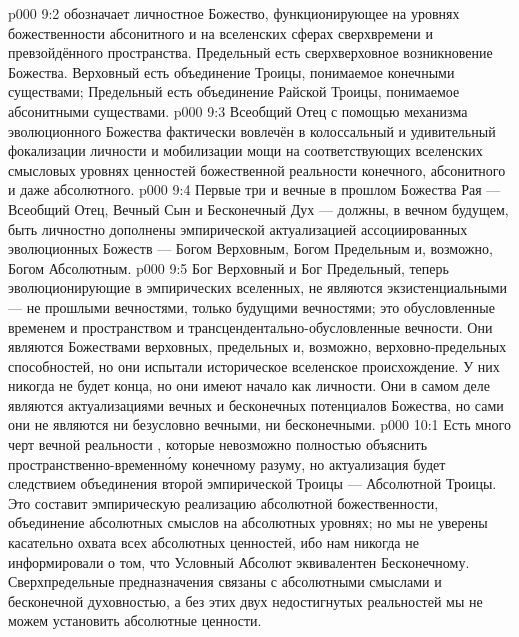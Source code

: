 \vs p000 9:2 \pc {} обозначает личностное Божество, функционирующее на уровнях божественности абсонитного и на вселенских сферах сверхвремени и превзойдённого пространства. Предельный есть сверхверховное возникновение Божества. Верховный есть объединение Троицы, понимаемое конечными существами; Предельный есть объединение Райской Троицы, понимаемое абсонитными существами.
\vs p000 9:3 Всеобщий Отец с помощью механизма эволюционного Божества фактически вовлечён в колоссальный и удивительный  фокализации личности и мобилизации мощи на соответствующих вселенских смысловых уровнях ценностей божественной реальности конечного, абсонитного и даже абсолютного.
\vs p000 9:4 Первые три и вечные в прошлом Божества Рая --- Всеобщий Отец, Вечный Сын и Бесконечный Дух --- должны, в вечном будущем, быть личностно дополнены эмпирической актуализацией ассоциированных эволюционных Божеств --- Богом Верховным, Богом Предельным и, возможно, Богом Абсолютным.
\vs p000 9:5 \pc Бог Верховный и Бог Предельный, теперь эволюционирующие в эмпирических вселенных, не являются экзистенциальными --- не прошлыми вечностями, только будущими вечностями; это обусловленные временем и пространством и трансцендентально\hyp{}обусловленные вечности. Они являются Божествами верховных, предельных и, возможно, верховно\hyp{}предельных способностей, но они испытали историческое вселенское происхождение. У них никогда не будет конца, но они имеют начало как личности. Они в самом деле являются актуализациями вечных и бесконечных потенциалов Божества, но сами они не являются ни безусловно вечными, ни бесконечными.
\vs p000 10:1 Есть много черт вечной реальности , которые невозможно полностью объяснить пространственно\hyp{}временн\'ому конечному разуму, но актуализация  будет следствием объединения второй эмпирической Троицы --- Абсолютной Троицы. Это составит эмпирическую реализацию абсолютной божественности, объединение абсолютных смыслов на абсолютных уровнях; но мы не уверены касательно охвата всех абсолютных ценностей, ибо нам никогда не информировали о том, что Условный Абсолют эквивалентен Бесконечному. Сверхпредельные предназначения связаны с абсолютными смыслами и бесконечной духовностью, а без этих двух недостигнутых реальностей мы не можем установить абсолютные ценности.
